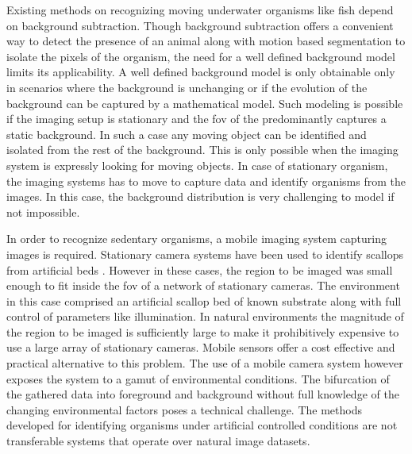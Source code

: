 \documentclass {udthesis}
\begin{document}
Existing methods on recognizing moving underwater organisms like fish depend on background subtraction. Though background subtraction 
offers a convenient way to detect the presence of an animal along with motion based segmentation to isolate the pixels of the organism, the need for a well defined background model limits its applicability. A well defined background model is only obtainable only in scenarios where the background is unchanging or if the evolution of the background can be captured by a mathematical model. Such modeling is possible if the imaging setup is stationary and the \gls{fov} of the predominantly captures a static background. In such a case any moving object can be identified and isolated from the rest of the background. This is only possible when the imaging system is expressly looking for moving objects. In case of stationary organism, the imaging systems has to move to capture data and identify organisms from the images. In this case, the background distribution is very challenging to model if not impossible.

In order to recognize sedentary organisms, a mobile imaging system capturing images is required. Stationary camera systems have been used to identify scallops from artificial beds \cite{enomoto9, enomoto10}. However in these cases, the region to be imaged was small enough to fit inside the \gls{fov} of a network of stationary cameras. The environment in this case comprised an artificial scallop bed of known substrate along with full control of parameters like illumination. In natural environments the magnitude of the region to be imaged is sufficiently large to make it prohibitively expensive to use a large array of stationary cameras. Mobile sensors offer a cost effective and practical alternative to this problem. The use of a mobile camera system however exposes the system to a gamut of environmental conditions. The bifurcation of the gathered data into foreground and background without full knowledge of the changing environmental factors poses a technical challenge. The methods developed for identifying 
organisms under artificial controlled conditions are not transferable systems that operate over natural image datasets.
\end{document}
